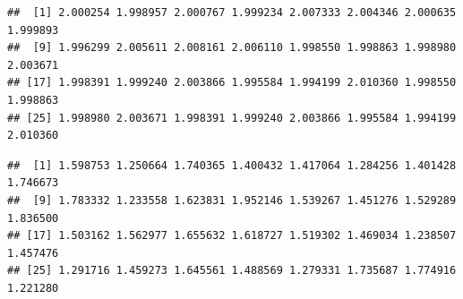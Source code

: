 \documentclass[
]{krantz}
\makeatletter
\newenvironment{Shaded}{\begin{snugshade}}{\end{snugshade}}
\newcommand{\AttributeTok}[1]{\textcolor[rgb]{0.77,0.63,0.00}{#1}}
\newcommand{\CommentTok}[1]{\textcolor[rgb]{0.56,0.35,0.01}{\textit{#1}}}
\newcommand{\DecValTok}[1]{\textcolor[rgb]{0.00,0.00,0.81}{#1}}
\newcommand{\FloatTok}[1]{\textcolor[rgb]{0.00,0.00,0.81}{#1}}
\newcommand{\FunctionTok}[1]{\textcolor[rgb]{0.00,0.00,0.00}{#1}}
\newcommand{\NormalTok}[1]{#1}
\newcommand{\OtherTok}[1]{\textcolor[rgb]{0.56,0.35,0.01}{#1}}
\newcommand{\SpecialCharTok}[1]{\textcolor[rgb]{0.00,0.00,0.00}{#1}}
\newcommand{\StringTok}[1]{\textcolor[rgb]{0.31,0.60,0.02}{#1}}
\newenvironment{kframe}{%
\medskip{}
\setlength{\fboxsep}{.8em}
 \def\at@end@of@kframe{}%
 \ifinner\ifhmode%
  \def\at@end@of@kframe{\end{minipage}}%
  \begin{minipage}{\columnwidth}%
 \fi\fi%
 \def\FrameCommand##1{\hskip\@totalleftmargin \hskip-\fboxsep
 \colorbox{shadecolor}{##1}\hskip-\fboxsep
     \hskip-\linewidth \hskip-\@totalleftmargin \hskip\columnwidth}%
 \MakeFramed {\advance\hsize-\width
   \@totalleftmargin\z@ \linewidth\hsize
   \@setminipage}}%
 {\par\unskip\endMakeFramed%
 \at@end@of@kframe}
\renewenvironment{Shaded}{\begin{kframe}}{\end{kframe}}
\makeatother
\begin{document}
\begin{Shaded}
\end{Shaded}

\begin{verbatim}
##  [1] 2.000254 1.998957 2.000767 1.999234 2.007333 2.004346 2.000635 1.999893
##  [9] 1.996299 2.005611 2.008161 2.006110 1.998550 1.998863 1.998980 2.003671
## [17] 1.998391 1.999240 2.003866 1.995584 1.994199 2.010360 1.998550 1.998863
## [25] 1.998980 2.003671 1.998391 1.999240 2.003866 1.995584 1.994199 2.010360
\end{verbatim}

\begin{Shaded}
\end{Shaded}

\begin{verbatim}
##  [1] 1.598753 1.250664 1.740365 1.400432 1.417064 1.284256 1.401428 1.746673
##  [9] 1.783332 1.233558 1.623831 1.952146 1.539267 1.451276 1.529289 1.836500
## [17] 1.503162 1.562977 1.655632 1.618727 1.519302 1.469034 1.238507 1.457476
## [25] 1.291716 1.459273 1.645561 1.488569 1.279331 1.735687 1.774916 1.221280
\end{verbatim}
\end{document}
